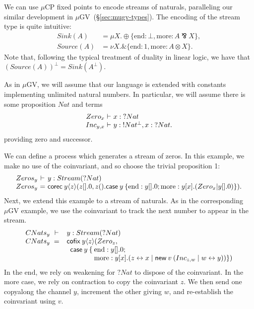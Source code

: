 \documentclass[orivec,envcountsame]{llncs}
\makeatletter
\newcommand{\with}{\mathbin\binampersand}
\newcommand{\parr}{\mathbin\bindnasrepma}
\newcommand{\cpdual}[1]{#1^\perp}
\newcommand{\cpbang}[1]{{! #1}}
\newcommand{\cpquery}[1]{{? #1}}
\newcommand{\mkwd}[1]{\mathsf{#1}}
\newcommand{\link}[2]{#1 \leftrightarrow #2}
\newcommand{\cut}[4]{\mkwd{new}\:#1 \: (#3 \mid #4)}
\newcommand{\corec}[5]{\mkwd{corec}\:#1 \langle #2 \rangle (#4,#5)}
\newcommand{\clabel}[1]{\mathrm{#1}}
\renewcommand{\case}[2]{\mkwd{case}\:#1\:\{#2\}}
\newcommand{\lrkwd}{\mkwd{cofix}}
\newcommand{\mucp}{$\mu\mathrm{CP}$\xspace}
\newcommand{\mugv}{$\mu\mathrm{GV}$\xspace}
\newcommand{\ba}{\begin{array}}
\newcommand{\ea}{\end{array}}
\newenvironment{eqs}{\ba{@{}r@{~}c@{~}l@{}}}{\ea}
\newcommand{\mcl}[2]{\multicolumn{#1}{l}{#2}}
\newcommand{\secref}[1]{(\S\ref{sec:#1})}
\makeatother
\begin{document}
We can use \mucp fixed points to encode streams of naturals, paralleling our similar development in
\mugv~\secref{mugv-types}.  The encoding of the stream type is quite intuitive:
\begin{align*}
  Sink(A) &= \mu X. \oplus \{ \clabel{end}: \bot, \clabel{more}: A \parr X \}, \\
  Source(A) &= \nu X. \with \{ \clabel{end}: 1, \clabel{more}: A \otimes X \}.
\end{align*}
Note that, following the typical treatment of duality in linear logic, we have that
$\cpdual{(Source(A))} = Sink(\cpdual{A})$.

As in \mugv, we will assume that our language is extended with constants implementing unlimited
natural numbers.  In particular, we will assume there is some proposition $Nat$ and terms
\[\begin{eqs}
Zero_x &\vdash& x:\cpquery{Nat} \\
Inc_{y,x} &\vdash& y:\cpbang{\cpdual{Nat}},x:\cpquery{Nat}.
\end{eqs}\]
providing zero and successor.

We can define a process which generates a stream of zeros.  In this example, we make no use of the
coinvariant, and so choose the trivial proposition 1:
\[\begin{eqs}
  Zeros_y &\vdash& y:Stream(\cpquery{Nat}) \\
  Zeros_y &=& \corec{y}{z}{1}{z[].0}{z().\case{y}{\clabel{end}: y[].0; \clabel{more}: y[x].(Zero_x | y[].0)}}.
\end{eqs}\]
Next, we extend this example to a stream of naturals.  As in the corresponding \mugv example, we use
the coinvariant to track the next number to appear in the stream.
\[\begin{array}{r@{\hspace{2mm}}c@{\hspace{2mm}}l@{\hspace{0mm}}l@{\:}l}
  CNats_y & \vdash & \mcl{3}{y:Stream(\cpquery{Nat})} \\
  CNats_y & = & \mcl{3}{\lrkwd \: y \langle z \rangle (Zero_z,} \\
  & & \quad & \mkwd{case}\:y \:\{ & \clabel{end}: y[].0; \\
  & & & & \clabel{more}: y[x].(\link{z}{x} \mid \cut{v}{}{Inc_{z,w}}{\link{w}{y}})\})
\end{array}\]
In the $\clabel{end}$, we rely on weakening for $\cpquery{Nat}$ to dispose of the coinvariant.  In
the $\clabel{more}$ case, we rely on contraction to copy the coinvariant $z$.  We then send one
copyalong the channel $y$, increment the other giving $w$, and re-establish the coinvariant using
$v$.
\end{document}
